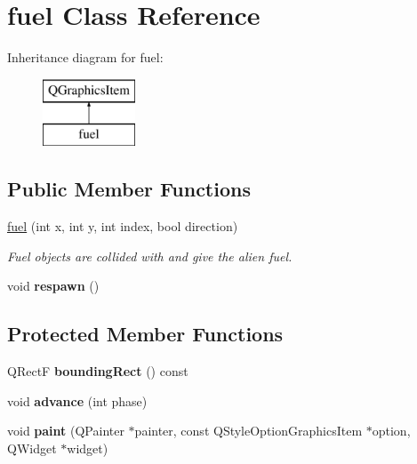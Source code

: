 \hypertarget{classfuel}{\section{fuel Class Reference}
\label{classfuel}
}
Inheritance diagram for fuel\-:\begin{figure}[H]
\begin{center}
\leavevmode
\includegraphics[height=2.000000cm]{classfuel}
\end{center}
\end{figure}
\subsection*{Public Member Functions}
\begin{DoxyCompactItemize}
\item 
\hyperlink{classfuel_ac671922b699142d7f799c4614bb68076}{fuel} (int x, int y, int index, bool direction)
\begin{DoxyCompactList}\small\item\em Fuel objects are collided with and give the alien fuel. \end{DoxyCompactList}\item 
\hypertarget{classfuel_aad4ba33ecb4e9f2fd88a0d833aac4655}{void {\bfseries respawn} ()}\label{classfuel_aad4ba33ecb4e9f2fd88a0d833aac4655}

\end{DoxyCompactItemize}
\subsection*{Protected Member Functions}
\begin{DoxyCompactItemize}
\item 
\hypertarget{classfuel_a48ba549a0290063a1dbcafddb68410a3}{Q\-Rect\-F {\bfseries bounding\-Rect} () const }\label{classfuel_a48ba549a0290063a1dbcafddb68410a3}

\item 
\hypertarget{classfuel_aa65db6b326d7d4408d6de0f8892a9add}{void {\bfseries advance} (int phase)}\label{classfuel_aa65db6b326d7d4408d6de0f8892a9add}

\item 
\hypertarget{classfuel_a102ff178372e69c77d2d71aecfdf38bc}{void {\bfseries paint} (Q\-Painter $\ast$painter, const Q\-Style\-Option\-Graphics\-Item $\ast$option, Q\-Widget $\ast$widget)}\label{classfuel_a102ff178372e69c77d2d71aecfdf38bc}

\end{DoxyCompactItemize}
